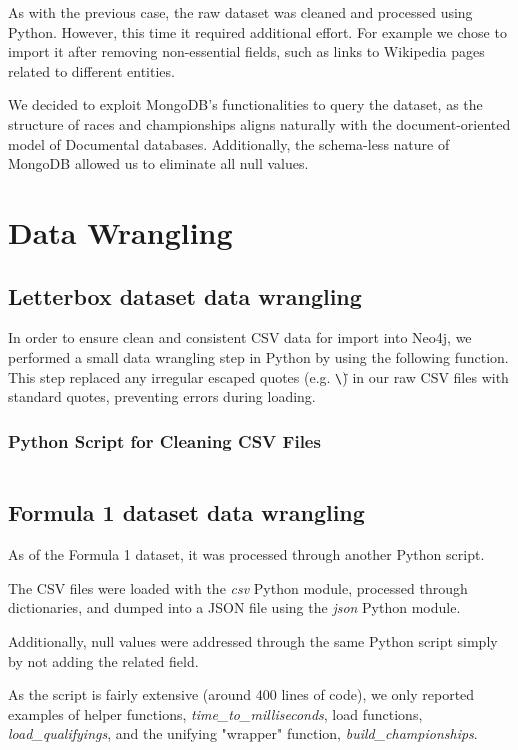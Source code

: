 \documentclass{Configuration_Files/PoliMi3i_thesis}
\begin{document}
As with the previous case, the raw dataset was cleaned and processed using Python. However, this time it required additional effort. For example we chose to import it after removing non-essential fields, such as links to Wikipedia pages related to different entities.

We decided to exploit MongoDB's functionalities to query the dataset, as the structure of races and championships aligns naturally with the document-oriented model of Documental databases. Additionally, the schema-less nature of MongoDB allowed us to eliminate all null values.

\chapter{Data Wrangling}
\section{Letterbox dataset data wrangling}
In order to ensure clean and consistent CSV data for import into Neo4j, we performed 
a small data wrangling step in Python by using the following function. This step replaced any irregular escaped quotes 
(e.g. \texttt{\textbackslash \"}) in our raw CSV files with standard quotes, preventing 
errors during loading.

\subsection*{Python Script for Cleaning CSV Files}

\inputminted{python}{letterboxd/letterboxdDataCleaning.py}

\section{Formula 1 dataset data wrangling}
As of the Formula 1 dataset, it was processed through another Python script.

The CSV files were loaded with the \textit{csv} Python module, processed through dictionaries, and dumped into a JSON file using the \textit{json} Python module.

Additionally, null values were addressed through the same Python script simply by not adding the related field.

As the script is fairly extensive (around 400 lines of code), we only reported examples of helper functions, \textit{time\_to\_milliseconds}, load functions, \textit{load\_qualifyings}, and the unifying "wrapper" function, \textit{build\_championships}.
\end{document}

